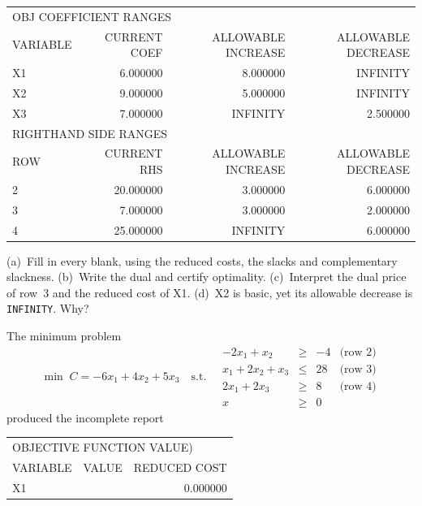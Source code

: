 \begin{problems}
\begin{center}
        \medskip
        \begin{tabular}{lrrr}
        \multicolumn{4}{l}{OBJ COEFFICIENT RANGES}\\
        VARIABLE & CURRENT COEF & ALLOWABLE INCREASE & ALLOWABLE DECREASE\\
        X1 & 6.000000 & 8.000000 & INFINITY\\
        X2 & 9.000000 & 5.000000 & INFINITY\\
        X3 & 7.000000 & INFINITY & 2.500000\\[3pt]
        \multicolumn{4}{l}{RIGHTHAND SIDE RANGES}\\
        ROW & CURRENT RHS & ALLOWABLE INCREASE & ALLOWABLE DECREASE\\
        2 & 20.000000 & 3.000000 & 6.000000\\
        3 & 7.000000 & 3.000000 & 2.000000\\
        4 & 25.000000 & INFINITY & 6.000000\\
        \end{tabular}
        \end{center}
        (a)~Fill in every blank, using the reduced costs, the slacks and
        complementary slackness. (b)~Write the dual and certify
        optimality. (c)~Interpret the dual price of row~3 and the reduced
        cost of X1. (d)~X2 is basic, yet its allowable decrease is
        \texttt{INFINITY}. Why?
  \item The minimum problem
        \[
          \min\; C=-6x_{1}+4x_{2}+5x_{3}
          \quad\text{s.t.}\quad
          \begin{array}{rcll}
            -2x_{1}+x_{2} &\ge& -4 & \text{(row 2)}\\
            x_{1}+2x_{2}+x_{3} &\le& 28 & \text{(row 3)}\\
            2x_{1}+2x_{3} &\ge& 8 & \text{(row 4)}\\
            x &\ge& 0
          \end{array}
        \]
        produced the incomplete report
        \begin{center}\footnotesize\ttfamily
        \begin{tabular}{lrr}
        \multicolumn{3}{l}{OBJECTIVE FUNCTION VALUE\quad 1)\ \underline{\hspace{3em}}}\\[3pt]
        VARIABLE & VALUE & REDUCED COST\\
        X1 & \underline{\hspace{3em}} & 0.000000\\

\end{tabular}
\end{center}
\end{problems}
